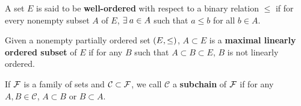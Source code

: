 \begin{definition*}
    A set $E$ is said to be \textbf{well-ordered} with respect 
    to a binary relation $\leq$ if for every nonempty subset 
    $A$ of $E$, $\exists\: a\in A$ such that $a\leq b$ for all 
    $b\in A$.
\end{definition*}

\begin{definition*}
    Given a nonempty partially ordered set $\pth{E,\leq}$, 
    $A\subset E$ is a \textbf{maximal linearly ordered subset} 
    of $E$ if for any $B$ such that $A\subset B\subset E$, 
    $B$ is not linearly ordered.
\end{definition*}

\begin{definition*}
    If $\mathcal{F}$ is a family of sets and $\mathcal{C}\subset\mathcal{F}$, we 
    call $\mathcal{C}$ a \textbf{subchain} of $\mathcal{F}$ if for any 
    $A,B\in\mathcal{C}$, $A\subset B$ or $B\subset A$.
\end{definition*}

